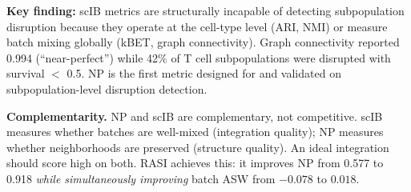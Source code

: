 \textbf{Key finding:} scIB metrics are structurally incapable of detecting subpopulation disruption because they operate at the cell-type level (ARI, NMI) or measure batch mixing globally (kBET, graph connectivity). Graph connectivity reported 0.994 (``near-perfect'') while 42\% of T cell subpopulations were disrupted with survival $<$ 0.5. NP is the first metric designed for and validated on subpopulation-level disruption detection.

\textbf{Complementarity.}
NP and scIB are complementary, not competitive. scIB measures whether batches are well-mixed (integration quality); NP measures whether neighborhoods are preserved (structure quality). An ideal integration should score high on both. RASI achieves this: it improves NP from 0.577 to 0.918 \textit{while simultaneously improving} batch ASW from $-0.078$ to $0.018$.
